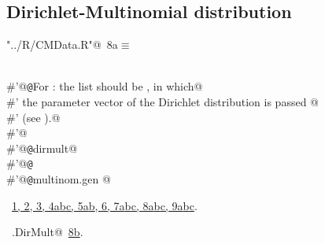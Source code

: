 \documentclass[reqno]{amsart}
\renewcommand{\NWtarget}[2]{\hypertarget{#1}{#2}}
\renewcommand{\NWlink}[2]{\hyperlink{#1}{#2}}
\begin{document}
\subsection{Dirichlet-Multinomial distribution}
\begin{flushleft} \small\label{scrap13}\raggedright\small
\NWtarget{nuweb8a}{} \verb@"../R/CMData.R"@\nobreak\ {\footnotesize {8a}}$\equiv$
\vspace{-1ex}
\begin{list}{}{} \item
\mbox{}\verb@@\\
\mbox{}\verb@#'@{\tt @}\verb@details For : the  list should be , in which@\\
\mbox{}\verb@#' the parameter vector of the Dirichlet distribution is passed @\\
\mbox{}\verb@#' (see ).@\\
\mbox{}\verb@#'@\\
\mbox{}\verb@#'@{\tt @}\verb@import dirmult@\\
\mbox{}\verb@#'@{\tt @}\verb@export@\\
\mbox{}\verb@#'@{\tt @}\verb@rdname multinom.gen @\\
\mbox{}\verb@@{\NWsep}
\end{list}
\vspace{-1.5ex}
\footnotesize
\begin{list}{}{\setlength{\itemsep}{-\parsep}\setlength{\itemindent}{-\leftmargin}}
\item \NWtxtFileDefBy\ \NWlink{nuweb1}{1}\NWlink{nuweb2}{, 2}\NWlink{nuweb3}{, 3}\NWlink{nuweb4a}{, 4a}\NWlink{nuweb4b}{b}\NWlink{nuweb4c}{c}\NWlink{nuweb5a}{, 5a}\NWlink{nuweb5b}{b}\NWlink{nuweb6}{, 6}\NWlink{nuweb7a}{, 7a}\NWlink{nuweb7b}{b}\NWlink{nuweb7c}{c}\NWlink{nuweb8a}{, 8a}\NWlink{nuweb8b}{b}\NWlink{nuweb8c}{c}\NWlink{nuweb9a}{, 9a}\NWlink{nuweb9b}{b}\NWlink{nuweb9c}{c}.
\item \NWtxtIdentsUsed\nobreak\  \verb@mg.DirMult@\nobreak\ \NWlink{nuweb8b}{8b}.
\item{}
\end{list}
\vspace{4ex}
\end{flushleft}
\end{document}
